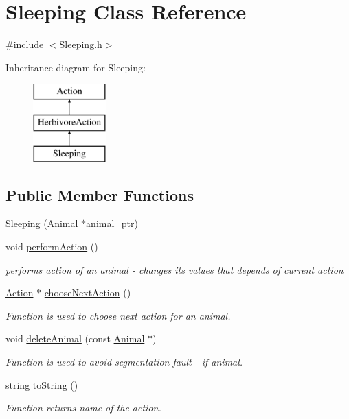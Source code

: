 \hypertarget{class_sleeping}{}\section{Sleeping Class Reference}
\label{class_sleeping}


{\ttfamily \#include $<$Sleeping.\+h$>$}

Inheritance diagram for Sleeping\+:\begin{figure}[H]
\begin{center}
\leavevmode
\includegraphics[height=3.000000cm]{class_sleeping}
\end{center}
\end{figure}
\subsection*{Public Member Functions}
\begin{DoxyCompactItemize}
\item 
\hyperlink{class_sleeping_a647c313fc4ba4ffd5c9fc28713fae267}{Sleeping} (\hyperlink{class_animal}{Animal} $\ast$animal\+\_\+ptr)
\item 
void \hyperlink{class_sleeping_a075291ac36c4c702728c1c6029a30ed7}{perform\+Action} ()
\begin{DoxyCompactList}\small\item\em performs action of an animal -\/ changes it\textquotesingle{}s values that depends of current action \end{DoxyCompactList}\item 
\hyperlink{class_action}{Action} $\ast$ \hyperlink{class_sleeping_ab7e0642b9b9a7acdf61c5dcd0bc41e59}{choose\+Next\+Action} ()
\begin{DoxyCompactList}\small\item\em Function is used to choose next action for an animal. \end{DoxyCompactList}\item 
void \hyperlink{class_sleeping_ab89f2382c544e14fad56c4476e7aad0e}{delete\+Animal} (const \hyperlink{class_animal}{Animal} $\ast$)
\begin{DoxyCompactList}\small\item\em Function is used to avoid segmentation fault -\/ if animal. \end{DoxyCompactList}\item 
string \hyperlink{class_sleeping_a7a9f89f9febd753e6eb99618cb714440}{to\+String} ()
\begin{DoxyCompactList}\small\item\em Function returns name of the action. \end{DoxyCompactList}\end{DoxyCompactItemize}
